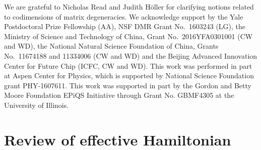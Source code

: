 \documentclass[aps, prb, showpacs, twocolumn, notitlepage, superscriptaddress]{revtex4-1}
\begin{document}
\begin{acknowledgments}

We are grateful to Nicholas Read and Judith H\"oller for clarifying notions related to codimensions of matrix degeneracies. 
We acknowledge support by  the Yale Postdoctoral Prize Fellowship (AA), NSF DMR Grant No.\ 1603243 (LG),  the Ministry of Science and Technology of China, Grant No.\ 2016YFA0301001 (CW and WD), the National Natural Science Foundation of China, Grants No.\ 11674188 and 11334006 (CW and WD) and the Beijing Advanced Innovation Center for Future Chip (ICFC, CW and WD). This work was performed in part at Aspen Center for Physics, which is supported by National Science Foundation grant PHY-1607611. This work was supported in part by the Gordon and Betty Moore Foundation EPiQS Initiative through Grant No. GBMF4305 at the University of Illinois.
\end{acknowledgments}




\appendix

\section{Review of effective Hamiltonian}\label{app:revieweffham}
\end{document}
